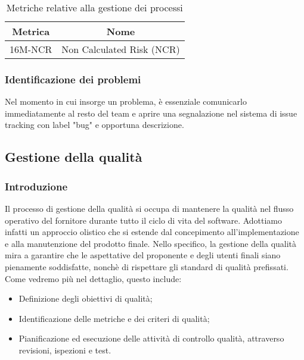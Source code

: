 \begin{table}[h]
	\caption{Metriche relative alla gestione dei processi}
	\centering
	\begin{tabular}{|c|c|}
		\hline
		\textbf{Metrica} & \textbf{Nome}             \\
		\hline
		16M-NCR          & Non Calculated Risk (NCR) \\
		\hline
	\end{tabular}
\end{table}

\subsubsection{Identificazione dei problemi}
Nel momento in cui insorge un problema, è essenziale comunicarlo immediatamente al resto del team e aprire una segnalazione nel sistema di
issue tracking con label "bug" e opportuna descrizione.

\subsection{Gestione della qualità}
\subsubsection{Introduzione}
Il processo di gestione della qualità si occupa di mantenere la qualità nel flusso operativo del fornitore
durante tutto il ciclo di vita del software. Adottiamo infatti un approccio
olistico che si estende dal concepimento all'implementazione e alla manutenzione del prodotto finale.
Nello specifico, la gestione della qualità mira a garantire che le aspettative del proponente e
degli utenti finali siano pienamente soddisfatte, nonchè di rispettare gli standard di qualità prefissati. Come vedremo più nel dettaglio,
questo include:
\begin{itemize}
	\item Definizione degli obiettivi di qualità;
	\item Identificazione delle metriche e dei criteri di qualità;
	\item Pianificazione ed esecuzione delle attività di controllo qualità, attraverso revisioni, ispezioni e test.
\end{itemize}

